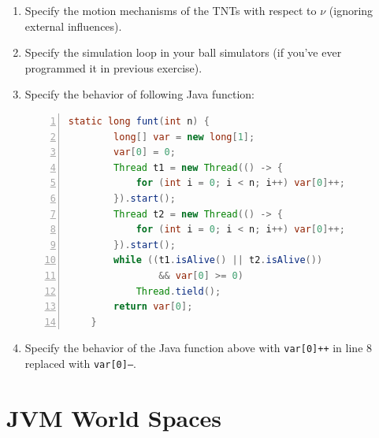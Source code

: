 \documentclass{book}
\theoremstyle{definition}\newtheorem{mechanism}{Mechanism}
\theoremstyle{remark}\newtheorem*{remark}{Remark}
\begin{document}
\begin{enumerate}
	\item Specify the motion mechanisms of the TNTs with respect to $\nu$ (ignoring external influences).
	\item Specify the simulation loop in your ball simulators (if you've ever programmed it in previous exercise).
	\item Specify the behavior of following Java function:
	\begin{lstlisting}[language=java, tabsize=4, numbers=left]
	static long funt(int n) {
		long[] var = new long[1];
		var[0] = 0;
		Thread t1 = new Thread(() -> { 
			for (int i = 0; i < n; i++) var[0]++; 
		}).start();
		Thread t2 = new Thread(() -> { 
			for (int i = 0; i < n; i++) var[0]++; 
		}).start();
		while ((t1.isAlive() || t2.isAlive())
				&& var[0] >= 0) 
			Thread.tield();
		return var[0];
	}
	\end{lstlisting}
	\item \label{exe:paralle-race} Specify the behavior of the Java function above with \texttt{var[0]++} in line 8 replaced with \texttt{var[0]--}.
\end{enumerate}


\section{JVM World Spaces}
\end{document}
